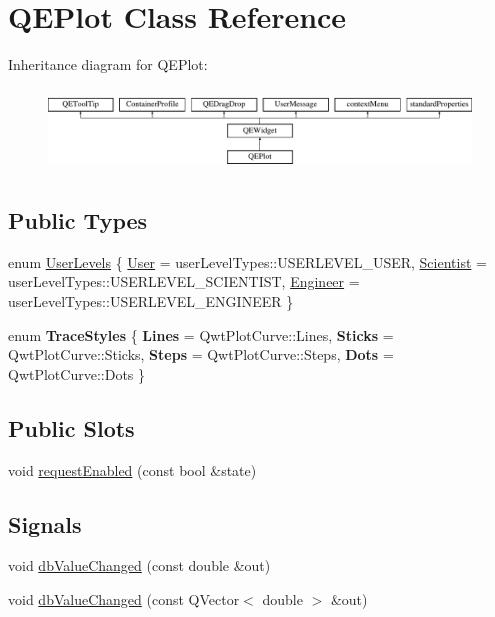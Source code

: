 \hypertarget{classQEPlot}{
\section{QEPlot Class Reference}
\label{classQEPlot}
}
Inheritance diagram for QEPlot:\begin{figure}[H]
\begin{center}
\leavevmode
\includegraphics[height=2.204725cm]{classQEPlot}
\end{center}
\end{figure}
\subsection*{Public Types}
\begin{DoxyCompactItemize}
\item 
enum \hyperlink{classQEPlot_a3f70d3a05c74fdd4b58eaeed443bc323}{UserLevels} \{ \hyperlink{classQEPlot_a3f70d3a05c74fdd4b58eaeed443bc323aac0b3747eaf8712dcf429ec538773f33}{User} =  userLevelTypes::USERLEVEL\_\-USER, 
\hyperlink{classQEPlot_a3f70d3a05c74fdd4b58eaeed443bc323af8eb0d1c9eaf5bf31da364e105e61658}{Scientist} =  userLevelTypes::USERLEVEL\_\-SCIENTIST, 
\hyperlink{classQEPlot_a3f70d3a05c74fdd4b58eaeed443bc323a820f591cbcb318da7733ff7e7d4d419a}{Engineer} =  userLevelTypes::USERLEVEL\_\-ENGINEER
 \}
\item 
enum {\bfseries TraceStyles} \{ {\bfseries Lines} =  QwtPlotCurve::Lines, 
{\bfseries Sticks} =  QwtPlotCurve::Sticks, 
{\bfseries Steps} =  QwtPlotCurve::Steps, 
{\bfseries Dots} =  QwtPlotCurve::Dots
 \}
\end{DoxyCompactItemize}
\subsection*{Public Slots}
\begin{DoxyCompactItemize}
\item 
void \hyperlink{classQEPlot_a16c5b1193a88ab1ed2e7496e0d570593}{requestEnabled} (const bool \&state)
\end{DoxyCompactItemize}
\subsection*{Signals}
\begin{DoxyCompactItemize}
\item 
void \hyperlink{classQEPlot_a09c2d1b104cd5970807bd9facc3c3b13}{dbValueChanged} (const double \&out)
\item 
void \hyperlink{classQEPlot_a1cab9bf6a187b59efbb13829735f5b24}{dbValueChanged} (const QVector$<$ double $>$ \&out)
\end{DoxyCompactItemize}
